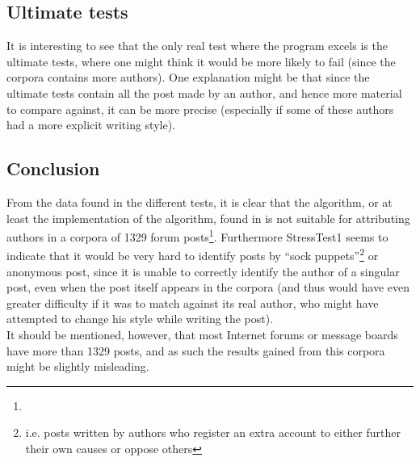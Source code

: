 \subsection{Ultimate tests}
It is interesting to see that the only real test where the program excels is the ultimate tests, where one might think it would be more likely to fail (since the corpora contains more authors). One explanation might be that since the ultimate tests contain all the post made by an author, and hence more material to compare against, it can be more precise (especially if some of these authors had a more explicit writing style).

\subsection{Conclusion}
From the data found in the different tests, it is clear that the algorithm, or at least the implementation of the algorithm, found in \cite{nr4} is not suitable for attributing authors in a corpora of 1329 forum posts\footnote{}. Furthermore StressTest1 seems to indicate that it would be very hard to identify posts by ``sock puppets''\footnote{i.e. posts written by authors who register an extra account to either further their own causes or oppose others} or anonymous post, since it is unable to correctly identify the author of a singular post, even when the post itself appears in the corpora (and thus would have even greater difficulty if it was to match against its real author, who might have attempted to change his style while writing the post).\\ 

It should be mentioned, however, that most Internet forums or message boards have more than 1329 posts, and as such the results gained from this corpora might be slightly misleading.
